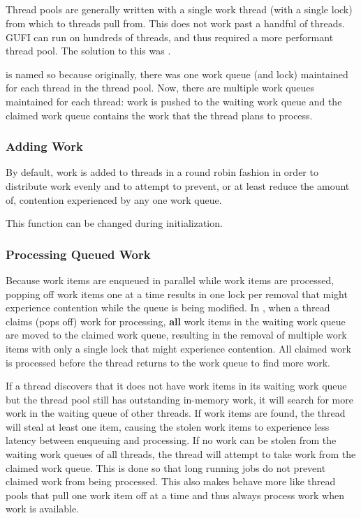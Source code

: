 \subsection{\qptp}
Thread pools are generally written with a single work thread (with a
single lock) from which to threads pull from. This does not work past
a handful of threads. GUFI can run on hundreds of threads, and thus
required a more performant thread pool. The solution to this was
\qptp.

\qptp is named so because originally, there was one work queue (and
lock) maintained for each thread in the thread pool. Now, there are
multiple work queues maintained for each thread: work is pushed to the
waiting work queue and the claimed work queue contains the work that
the thread plans to process.

\subsubsection{Adding Work}
By default, work is added to threads in a round robin fashion in order
to distribute work evenly and to attempt to prevent, or at least
reduce the amount of, contention experienced by any one work queue.

This function can be changed during initialization.

\subsubsection{Processing Queued Work}
Because work items are enqueued in parallel while work items are
processed, popping off work items one at a time results in one lock
per removal that might experience contention while the queue is being
modified. In \qptp, when a thread claims (pops off) work for
processing, {\bf all} work items in the waiting work queue are moved
to the claimed work queue, resulting in the removal of multiple work
items with only a single lock that might experience contention. All
claimed work is processed before the thread returns to the work queue
to find more work.

If a thread discovers that it does not have work items in its waiting
work queue but the thread pool still has outstanding in-memory work,
it will search for more work in the waiting queue of other threads. If
work items are found, the thread will steal at least one item, causing
the stolen work items to experience less latency between enqueuing and
processing. If no work can be stolen from the waiting work queues of
all threads, the thread will attempt to take work from the claimed
work queue. This is done so that long running jobs do not prevent
claimed work from being processed. This also makes \qptp behave more
like thread pools that pull one work item off at a time and thus
always process work when work is available.

